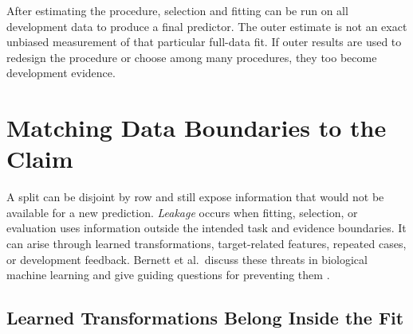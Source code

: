 \par\addvspace{\intextsep}\noindent\begin{minipage}{\linewidth}
\centering
{}
\label{fig:nested-cross-validation}
\end{minipage}\par\addvspace{\intextsep}

After estimating the procedure, selection and fitting can be run on all development data to produce a final predictor. The outer estimate is not an exact unbiased measurement of that particular full-data fit. If outer results are used to redesign the procedure or choose among many procedures, they too become development evidence.

\section{Matching Data Boundaries to the Claim}

A split can be disjoint by row and still expose information that would not be available for a new prediction. \emph{Leakage} occurs when fitting, selection, or evaluation uses information outside the intended task and evidence boundaries. It can arise through learned transformations, target-related features, repeated cases, or development feedback. Bernett et al.\ discuss these threats in biological machine learning and give guiding questions for preventing them \citep{bernett2024}.

\subsection{Learned Transformations Belong Inside the Fit}

